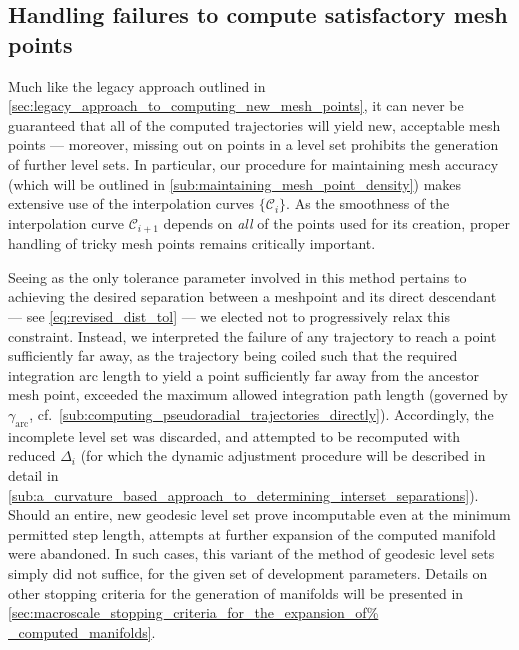 \subsection{Handling failures to compute satisfactory mesh points}
\label{sub:handling_failures_to_compute_satisfactory_mesh_points_revised}

Much like the legacy approach outlined in
\cref{sec:legacy_approach_to_computing_new_mesh_points}, it can never be
guaranteed that all of the computed trajectories will yield new, acceptable
mesh points --- moreover, missing out on points in a level set prohibits
the generation of further level sets. In particular, our procedure for maintaining
mesh accuracy (which will be outlined in
\cref{sub:maintaining_mesh_point_density}) makes extensive use of the
interpolation curves $\{\mathcal{C}_{i}\}$. As the smoothness of the
interpolation curve $\mathcal{C}_{i+1}$ depends on \emph{all} of the points
used for its creation, proper handling of tricky mesh points remains critically
important.

Seeing as the only tolerance parameter involved in this method pertains to
achieving the desired separation between a meshpoint and its direct descendant
--- see \cref{eq:revised_dist_tol} --- we elected not to progressively relax
this constraint. Instead, we interpreted the failure of any trajectory to reach
a point sufficiently far away, as the trajectory being coiled such that the
required integration arc length to yield a point sufficiently far away from
the ancestor mesh point, exceeded the maximum allowed integration path
length (governed by $\gamma_{\text{arc}}$, cf.\
\cref{sub:computing_pseudoradial_trajectories_directly}). Accordingly, the
incomplete level set was discarded, and attempted to be recomputed with reduced
$\Delta_{i}$ (for which the dynamic adjustment procedure will be described in
detail in
\cref{sub:a_curvature_based_approach_to_determining_interset_separations}).
Should an entire, new geodesic level set prove incomputable even at the
minimum permitted step length, attempts at further expansion of the computed
manifold were abandoned. In such cases, this variant of the method of geodesic
level sets simply did not suffice, for the given set of development parameters.
Details on other stopping criteria for the generation of manifolds will be
presented in \cref{sec:macroscale_stopping_criteria_for_the_expansion_of%
_computed_manifolds}.

